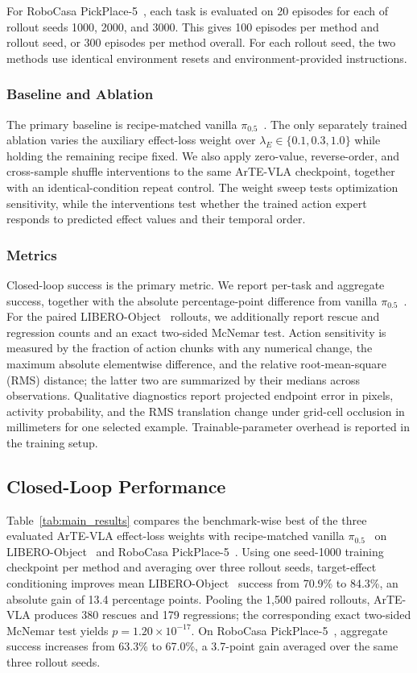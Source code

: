 \documentclass[letterpaper,10pt,conference]{ieeeconf}
\newcommand{\method}{ArTE-VLA}
\newcommand{\pihalf}{\ensuremath{\pi_{0.5}}}
\begin{document}
For RoboCasa PickPlace-5~\cite{robocasa2024}, each task is evaluated on 20 episodes for each of rollout seeds 1000, 2000, and 3000.
This gives 100 episodes per method and rollout seed, or 300 episodes per method overall.
For each rollout seed, the two methods use identical environment resets and environment-provided instructions.

\subsubsection{Baseline and Ablation}

The primary baseline is recipe-matched vanilla \pihalf{}~\cite{pi05}.
The only separately trained ablation varies the auxiliary effect-loss weight over $\lambda_E\in\{0.1,0.3,1.0\}$ while holding the remaining recipe fixed.
We also apply zero-value, reverse-order, and cross-sample shuffle interventions to the same \method{} checkpoint, together with an identical-condition repeat control.
The weight sweep tests optimization sensitivity, while the interventions test whether the trained action expert responds to predicted effect values and their temporal order.

\subsubsection{Metrics}

Closed-loop success is the primary metric.
We report per-task and aggregate success, together with the absolute percentage-point difference from vanilla \pihalf{}~\cite{pi05}.
For the paired LIBERO-Object~\cite{libero} rollouts, we additionally report rescue and regression counts and an exact two-sided McNemar test.
Action sensitivity is measured by the fraction of action chunks with any numerical change, the maximum absolute elementwise difference, and the relative root-mean-square (RMS) distance; the latter two are summarized by their medians across observations.
Qualitative diagnostics report projected endpoint error in pixels, activity probability, and the RMS translation change under grid-cell occlusion in millimeters for one selected example.
Trainable-parameter overhead is reported in the training setup.

\subsection{Closed-Loop Performance}

Table~\ref{tab:main_results} compares the benchmark-wise best of the three evaluated \method{} effect-loss weights with recipe-matched vanilla \pihalf{}~\cite{pi05} on LIBERO-Object~\cite{libero} and RoboCasa PickPlace-5~\cite{robocasa2024}.
Using one seed-1000 training checkpoint per method and averaging over three rollout seeds, target-effect conditioning improves mean LIBERO-Object~\cite{libero} success from 70.9\% to 84.3\%, an absolute gain of 13.4 percentage points.
Pooling the 1,500 paired rollouts, \method{} produces 380 rescues and 179 regressions; the corresponding exact two-sided McNemar test yields $p=1.20\times10^{-17}$.
On RoboCasa PickPlace-5~\cite{robocasa2024}, aggregate success increases from 63.3\% to 67.0\%, a 3.7-point gain averaged over the same three rollout seeds.
\end{document}
